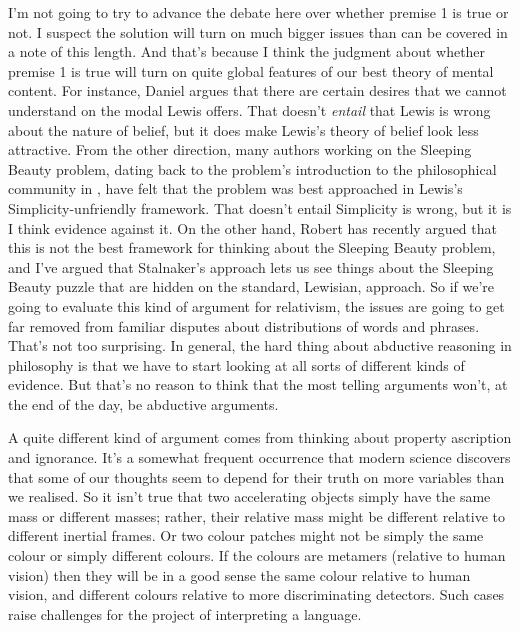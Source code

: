 I'm not going to try to advance the debate here over whether premise 1 is true or not. I suspect the solution will turn on much bigger issues than can be covered in a note of this length. And that's because I think the judgment about whether premise 1 is true will turn on quite global features of our best theory of mental content. For instance, Daniel \citet{Nolan2006-NOLSD} argues that there are certain desires that we cannot understand on the modal Lewis offers. That doesn't \textit{entail} that Lewis is wrong about the nature of belief, but it does make Lewis's theory of belief look less attractive. From the other direction, many authors working on the Sleeping Beauty problem, dating back to the problem's introduction to the philosophical community in \citet{Elga2000-ELGSBA}, have felt that the problem was best approached in Lewis's Simplicity-unfriendly framework. That doesn't entail Simplicity is wrong, but it is I think evidence against it. On the other hand, Robert \citet{Stalnaker2008-STAOKO} has recently argued that this is not the best framework for thinking about the Sleeping Beauty problem, and I've argued \citep{Weatherson-SoSB} that Stalnaker's approach lets us see things about the Sleeping Beauty puzzle that are hidden on the standard, Lewisian, approach. So if we're going to evaluate this kind of argument for relativism, the issues are going to get far removed from familiar disputes about distributions of words and phrases. That's not too surprising. In general, the hard thing about abductive reasoning in philosophy is that we have to start looking at all sorts of different kinds of evidence. But that's no reason to think that the most telling arguments won't, at the end of the day, be abductive arguments.

A quite different kind of argument comes from thinking about property ascription and ignorance. It's a somewhat frequent occurrence that modern science discovers that some of our thoughts seem to depend for their truth on more variables than we realised. So it isn't true that two accelerating objects simply have the same mass or different masses; rather, their relative mass might be different relative to different inertial frames. Or two colour patches might not be simply the same colour or simply different colours. If the colours are metamers (relative to human vision) then they will be in a good sense the same colour relative to human vision, and different colours relative to more discriminating detectors. Such cases raise challenges for the project of interpreting a language.


